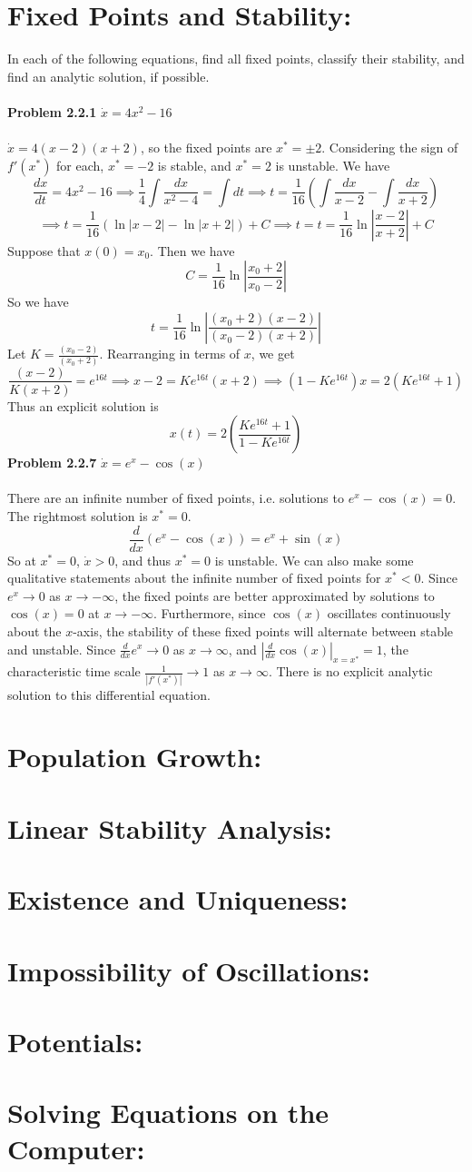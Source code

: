 \documentclass[fleqn]{article}
\begin{document}
\section*{Fixed Points and Stability:}
In each of the following equations, find all fixed points, classify their stability, and find an analytic solution, if possible.
\\\\
\textbf{Problem 2.2.1} $\dot{x}=4x^2-16$
\\\\
$\dot{x}=4(x-2)(x+2)$, so the fixed points are $x^*=\pm2$. Considering the sign of $f'(x^*)$ for each, $x^*=-2$ is stable, and $x^*=2$ is unstable. We have
\[
\frac{dx}{dt}=4x^2-16\implies\frac{1}{4}\int\frac{dx}{x^2-4}=\int dt\implies t=\frac{1}{16}\left(\int\frac{dx}{x-2}-\int\frac{dx}{x+2}\right)
\]
\[
\implies t=\frac{1}{16}(\ln|x-2|-\ln|x+2|)+C\implies t=t=\frac{1}{16}\ln\left|\frac{x-2}{x+2}\right|+C
\]
Suppose that $x(0)=x_0$. Then we have
\[
C=\frac{1}{16}\ln\left|\frac{x_0+2}{x_0-2}\right|
\]
So we have
\[
t=\frac{1}{16}\ln\left|\frac{(x_0+2)(x-2)}{(x_0-2)(x+2)}\right|
\]
Let $K=\frac{(x_0-2)}{(x_0+2)}$. Rearranging in terms of $x$, we get
\[
\frac{(x-2)}{K(x+2)}=e^{16t}\implies x-2=Ke^{16t}(x+2)\implies (1-Ke^{16t})x=2(Ke^{16t}+1)
\]
Thus an explicit solution is
\[
x(t)=2\left(\frac{Ke^{16t}+1}{1-Ke^{16t}}\right)
\]
\textbf{Problem 2.2.7} $\dot{x}=e^x-\cos(x)$
\\\\
There are an infinite number of fixed points, i.e. solutions to $e^x-\cos(x)=0$. The rightmost solution is $x^*=0$.
\[
\frac{d}{dx}(e^x-\cos(x))=e^x+\sin(x)
\]
So at $x^*=0$, $\dot{x}>0$, and thus $x^*=0$ is unstable. We can also make some qualitative statements about the infinite number of fixed points for $x^*<0$. Since $e^x\to0$ as $x\to-\infty$, the fixed points are better approximated by solutions to $\cos(x)=0$ at $x\to-\infty$. Furthermore, since $\cos(x)$ oscillates continuously about the $x$-axis, the stability of these fixed points will alternate between stable and unstable. Since $\frac{d}{dx}e^x\to0$ as $x\to\infty$, and $\left|\frac{d}{dx}\cos(x)\right|_{x=x^*}=1$, the characteristic time scale $\frac{1}{|f'(x^*)|}\to1$ as $x\to\infty$. There is no explicit analytic solution to this differential equation.
\section*{Population Growth:}
\section*{Linear Stability Analysis:}
\section*{Existence and Uniqueness:}
\section*{Impossibility of Oscillations:}
\section*{Potentials:}
\section*{Solving Equations on the Computer:}
\end{document}
